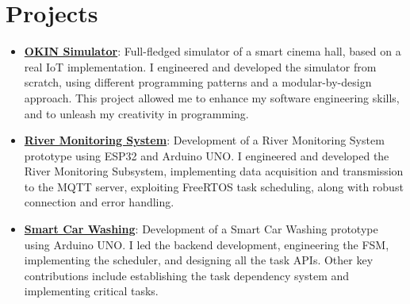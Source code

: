 \documentclass[letterpaper,11pt]{article}
\newcommand{\resumeItem}[2]{
  \item\small{
    \textbf{#1}{: #2 \vspace{-2pt}}
  }
}
\newcommand{\resumeSubItem}[2]{\resumeItem{#1}{#2}\vspace{-4pt}}
\newcommand{\resumeSubHeadingListStart}{\begin{itemize}[leftmargin=*]}
\newcommand{\resumeSubHeadingListEnd}{\end{itemize}}
\begin{document}
\section{Projects}
  \resumeSubHeadingListStart
  \resumeSubItem{\href{https://github.com/aleemont1/OKINsimulator}{OKIN Simulator}}
      {Full-fledged simulator of a smart cinema hall, based on a real IoT implementation.
       I engineered and developed the simulator from scratch, using different programming patterns and
       a modular-by-design approach. This project allowed me to enhance my software engineering skills, and
       to unleash my creativity in programming.}
    \resumeSubItem{\href{https://github.com/aleemont1/esiot-23-24-assignment3/}{River Monitoring System}}
      {Development of a River Monitoring System prototype using ESP32 and Arduino UNO.
       I engineered and developed the River Monitoring Subsystem, implementing data acquisition and
       transmission to the MQTT server, exploiting FreeRTOS task scheduling, along with robust connection and error handling.}
    \resumeSubItem{\href{https://github.com/aleemont1/esiot-23-24-assignment2/}{Smart Car Washing}}
      {Development of a Smart Car Washing prototype using Arduino UNO. 
      I led the backend development, engineering the FSM, implementing the scheduler, and designing all the task APIs. 
      Other key contributions include establishing the task dependency system and implementing critical tasks.}
  \resumeSubHeadingListEnd
\end{document}
